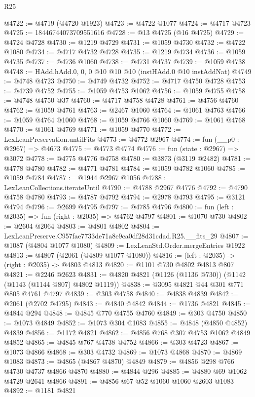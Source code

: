 \begin{lexlean}{R25}
\begin{coremodule}
@4722 := @4719 (@4720 @1923)
@4723 := @4722 @1077
@4724 := @4717 @4723
@4725 := 18446744073709551616
@4728 := @13 @4725 (@16 @4725)
@4729 := @4724 @4728
@4730 := @1219 @4729
@4731 := @1059 @4730
@4732 := @4722 @1080
@4734 := @4717 @4732 @4728
@4735 := @1219 @4734
@4736 := @1059 @4735
@4737 := @4736 @1060
@4738 := @4731 @4737
@4739 := @1059 @4738
@4748 := HAdd.hAdd.{0, 0, 0} @10 @10 @10 (instHAdd.{0} @10 instAddNat)
@4749 := @4748 @4723
@4750 := @4749 @4732
@4752 := @4717 @4750 @4728
@4753 := @4739 @4752
@4755 := @1059 @4753 @1062
@4756 := @1059 @4755
@4758 := @4748 @4750 @37
@4760 := @4717 @4758 @4728
@4761 := @4756 @4760
@4762 := @1059 @4761
@4763 := @2467 @1060
@4764 := @1061 @4763
@4766 := @1059 @4764 @1060
@4768 := @1059 @4766 @1060
@4769 := @1061 @4768
@4770 := @1061 @4769
@4771 := @1059 @4770
@4772 := LexLeanPreservation.untilFits
@4773 := @4772 @2967
@4774 := fun (__p0 : @2967) => @4673
@4775 := @4773 @4774
@4776 := fun (state : @2967) => @3072
@4778 := @4775 @4776 @4758
@4780 := @3873 (@3119 @2482)
@4781 := @4778 @4780
@4782 := @4771 @4781
@4784 := @1059 @4782 @1060
@4785 := @1059 @4784
@4787 := @1944 @2967 @1056
@4788 := LexLeanCollections.iterateUntil
@4790 := @4788 @2967 @4776
@4792 := @4790 @4758 @4780
@4793 := @4787 @4792
@4794 := @2978 @4793
@4795 := @3121 @4794
@4796 := @2699 @4795
@4797 := @4785 @4796
@4800 := fun (left : @2035) => fun (right : @2035) => @4762 @4797
@4801 := @1070 @730
@4802 := @2604 @2064
@4803 := @4801 @4802
@4804 := LexLeanPreserve.C957fae7733de71a8e9ca0df28d31cdad.R25.__fits_29
@4807 := @1087 (@4804 @1077 @1080)
@4809 := LexLeanStd.Order.mergeEntries @1922
@4813 := @4807 (@2061 (@4809 @1077 @1080))
@4816 := (left : @2035) -> (right : @2035) -> @4803 @4813
@4820 := @1101 @730 @4802 @4813 @807
@4821 := @2246 @2623
@4831 := @4820 @4821 (@1126 (@1136 @730)) (@1142 (@1143 (@1144 @807) @4802 @1119))
@4838 := @3095 @4821 @44 @301 @771 @805 @4761 @4797
@4839 := @303 @4758
@4840 := @4838 @4839
@4842 := @2061 (@2702 @4795)
@4843 := @4840 @4842
@4844 := @1736 @4821
@4845 := @4844 @294
@4848 := @4845 @770 @4755 @4760
@4849 := @303 @4750
@4850 := @1073 @4849
@4852 := @1073 @304 @1083
@4855 := @4848 (@4850 @4852) @4839
@4856 := @1172 @4821
@4862 := @4856 @768 @307 @4753 @1062 @4849 @4852
@4865 := @4845 @767 @4738 @4752
@4866 := @303 @4723
@4867 := @1073 @4866
@4868 := @303 @4732
@4869 := @1073 @4868
@4870 := @4869 @1083
@4873 := @4865 (@4867 @4870) @4849
@4879 := @4856 @298 @766 @4730 @4737 @4866 @4870
@4880 := @4844 @296
@4885 := @4880 @69 @1062 @4729 @2641 @4866
@4891 := @4856 @67 @52 @1060 @1060 @2603 @1083
@4892 := @1181 @4821

\end{coremodule}
\end{lexlean}
